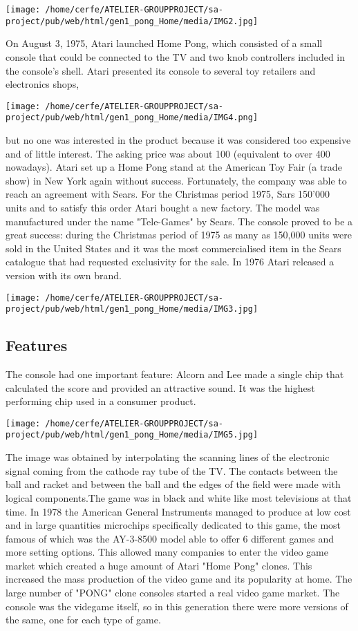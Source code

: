 \documentclass[a4paper,10pt]{book}
\begin{document}
 
 \texttt{[image: /home/cerfe/ATELIER-GROUPPROJECT/sa-project/pub/web/html/gen1\_pong\_Home/media/IMG2.jpg]}
 
 
          On August 3, 1975, Atari launched Home Pong, which consisted of a small console that could be connected to the TV and two knob controllers included in the console's shell. Atari presented its console to several toy retailers and electronics shops,
         
 \texttt{[image: /home/cerfe/ATELIER-GROUPPROJECT/sa-project/pub/web/html/gen1\_pong\_Home/media/IMG4.png]}
 
           but no one was interested in the product because it was considered too expensive and of little interest. The asking price was about 100 (equivalent to over 400 nowadays). Atari set up a Home Pong stand at the American Toy Fair (a trade show) in New York again without success. Fortunately, the company was able to reach an agreement with Sears. For the Christmas period 1975, Sars 150'000 units and to satisfy this order Atari bought a new factory. The model was manufactured under the name "Tele-Games" by Sears. The console proved to be a great success: during the Christmas period of 1975 as many as 150,000 units were sold in the United States and it was the most commercialised item in the Sears catalogue that had requested exclusivity for the sale. In 1976 Atari released a version with its own brand.
           
 
 \texttt{[image: /home/cerfe/ATELIER-GROUPPROJECT/sa-project/pub/web/html/gen1\_pong\_Home/media/IMG3.jpg]}
 
 
 \subsection{Features }
 The console had one important feature: Alcorn and Lee made a single chip that calculated the score and provided an attractive sound. It was the highest performing chip used in a consumer product.
 
 
 \texttt{[image: /home/cerfe/ATELIER-GROUPPROJECT/sa-project/pub/web/html/gen1\_pong\_Home/media/IMG5.jpg]}
 
          The image was obtained by interpolating the scanning lines of the electronic signal coming from the cathode ray tube of the TV. The contacts between the ball and racket and between the ball and the edges of the field were made with logical components.The game was in black and white like most televisions at that time.
          In 1978 the American General Instruments managed to produce at low cost and in large quantities microchips specifically dedicated to this game, the most famous of which was the AY-3-8500 model able to offer 6 different games and more setting options. This allowed many companies to enter the video game market which created a huge amount of Atari "Home Pong" clones. This increased the mass production of the video game and its popularity at home. The large number of "PONG" clone consoles started a real video game market. The console was the videgame itself, so in this generation there were more versions of the same, one for each type of game.
           
\end{document}
